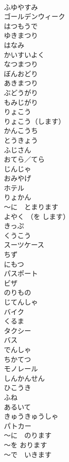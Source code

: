 \documentclass[8pt]{extreport}
\begin{document}
\begin{CJK}{UTF8}{min}
\\	ふゆやすみ	
\\	ゴールデンウィーク	
\\	はつもうで	
\\	ゆきまつり	
\\	はなみ	
\\	かいすいよく	
\\	なつまつり	
\\	ぼんおどり	
\\	あきまつり	
\\	ぶどうがり	
\\	もみじがり	
\\	りょこう	
\\	りょこう（します）	
\\	かんこうち	
\\	とうきょう	
\\	ふじさん	
\\	おてら／てら	
\\	じんじゃ	
\\	おみやげ	
\\	ホテル	
\\	りょかん	
\\	～に　とまります	
\\	よやく （を します）	
\\	きっぷ	
\\	くうこう	
\\	スーツケース	
\\	ちず	
\\	にもつ	
\\	パスポート	
\\	ビザ	
\\	のりもの	
\\	じてんしゃ	
\\	バイク	
\\	くるま	
\\	タクシー	
\\	バス	
\\	でんしゃ	
\\	ちかてつ	
\\	モノレール	
\\	しんかんせん	
\\	ひこうき	
\\	ふね	
\\	あるいて	
\\	きゅうきゅうしゃ	
\\	パトカー	
\\	～に　のります	
\\	～を おります	
\\	～で　いきます	

\end{CJK}
\end{document}
